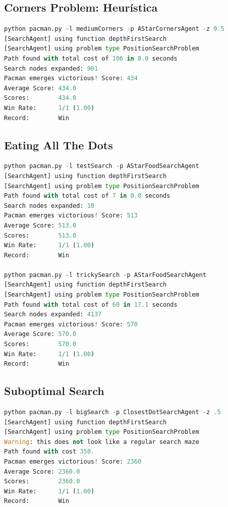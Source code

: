 \documentclass{report}
\begin{document}
        \clearpage\subsection{Corners Problem: Heurística}
          \begin{lstlisting}[language=Python, caption=Prueba Heurística Corners Problem]
python pacman.py -l mediumCorners -p AStarCornersAgent -z 0.5
[SearchAgent] using function depthFirstSearch
[SearchAgent] using problem type PositionSearchProblem
Path found with total cost of 106 in 0.0 seconds
Search nodes expanded: 901
Pacman emerges victorious! Score: 434
Average Score: 434.0
Scores:        434.0
Win Rate:      1/1 (1.00)
Record:        Win
          \end{lstlisting}
        \clearpage\subsection{Eating All The Dots}
          \begin{lstlisting}[language=Python, caption=Prueba Eating All The Dots]
python pacman.py -l testSearch -p AStarFoodSearchAgent
[SearchAgent] using function depthFirstSearch
[SearchAgent] using problem type PositionSearchProblem
Path found with total cost of 7 in 0.0 seconds
Search nodes expanded: 10
Pacman emerges victorious! Score: 513
Average Score: 513.0
Scores:        513.0
Win Rate:      1/1 (1.00)
Record:        Win

python pacman.py -l trickySearch -p AStarFoodSearchAgent
[SearchAgent] using function depthFirstSearch
[SearchAgent] using problem type PositionSearchProblem
Path found with total cost of 60 in 17.1 seconds
Search nodes expanded: 4137
Pacman emerges victorious! Score: 570
Average Score: 570.0
Scores:        570.0
Win Rate:      1/1 (1.00)
Record:        Win
          \end{lstlisting}
        \clearpage\subsection{Suboptimal Search}
          \begin{lstlisting}[language=Python, caption=Prueba Suboptimal Search]
python pacman.py -l bigSearch -p ClosestDotSearchAgent -z .5
[SearchAgent] using function depthFirstSearch
[SearchAgent] using problem type PositionSearchProblem
Warning: this does not look like a regular search maze
Path found with cost 350.
Pacman emerges victorious! Score: 2360
Average Score: 2360.0
Scores:        2360.0
Win Rate:      1/1 (1.00)
Record:        Win
          \end{lstlisting}
\end{document}
